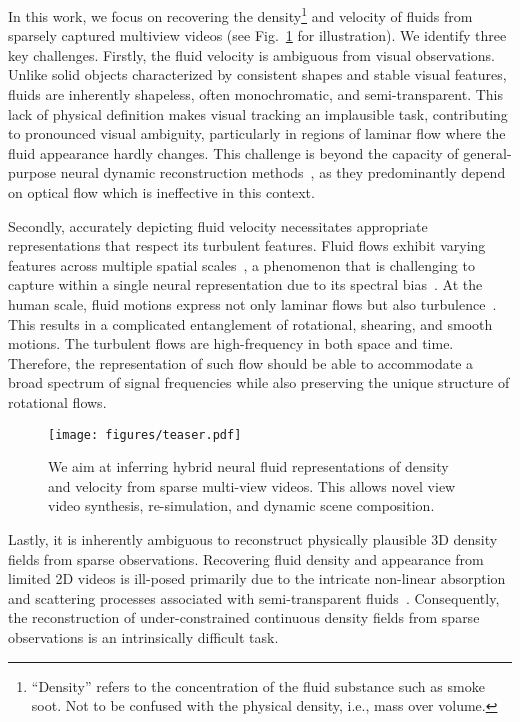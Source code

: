 \documentclass{article}
\newcommand{\fig}[1]{Fig.~\ref{#1}}
\begin{document}
In this work, we focus on recovering the density\footnote{``Density'' refers to the concentration of the fluid substance such as smoke soot. Not to be confused with the physical density, i.e., mass over volume.} and velocity of fluids from sparsely captured multiview videos (see \fig{fig:teaser} for illustration). We identify three key challenges. Firstly, the fluid velocity is ambiguous from visual observations. Unlike solid objects characterized by consistent shapes and stable visual features, fluids are inherently shapeless, often monochromatic, and semi-transparent. This lack of physical definition makes visual tracking an implausible task, contributing to pronounced visual ambiguity, particularly in regions of laminar flow where the fluid appearance hardly changes. This challenge is beyond the capacity of general-purpose neural dynamic reconstruction methods~\citep{li2021neural,du2021neural}, as they predominantly depend on optical flow which is ineffective in this context.

Secondly, accurately depicting fluid velocity necessitates appropriate representations that respect its turbulent features. Fluid flows exhibit varying features across multiple spatial scales~\citep{frisch1996turbulence}, a phenomenon that is challenging to capture within a single neural representation due to its spectral bias~\citep{rahaman2019spectral}. At the human scale, fluid motions express not only laminar flows but also turbulence~\citep{pope2000turbulent}. This results in a complicated entanglement of rotational, shearing, and smooth motions. The turbulent flows are high-frequency in both space and time. Therefore, the representation of such flow should be able to accommodate a broad spectrum of signal frequencies while also preserving the unique structure of rotational flows.

\begin{figure}[t!]
\centering
\texttt{[image: figures/teaser.pdf]}
\caption{We aim at inferring hybrid neural fluid representations of density and velocity from sparse multi-view videos. This allows novel view video synthesis, re-simulation, and dynamic scene composition.}
\vspace{-0.05in}
\label{fig:teaser}
\end{figure} Lastly, it is inherently ambiguous to reconstruct physically plausible 3D density fields from sparse observations. Recovering fluid density and appearance from limited 2D videos is ill-posed primarily due to the intricate non-linear absorption and scattering processes associated with semi-transparent fluids~\citep{max1995optical}. Consequently, the reconstruction of under-constrained continuous density fields from sparse observations is an intrinsically difficult task.
\end{document}
